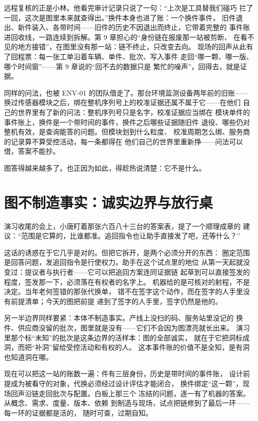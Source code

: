 远程复核的正是小林。他看完审计记录只说了一句：“上次是工具替我们碰巧
拦了一回，这次是图里本来就查得出。”换件本身也进了账：一个换件事件，
旧件退出、新件装入、各带时间——旧件的历史不因退出而终止，它带着完整的
事件账进回收线，一路连续到拆解。第 9 章担心的“身份链在报废那一站被剪断、
在看不见的地方接错”，在图里没有那一站：链不终止，只改变去向。
现场的回声从此有了回程票：每一张工单沿着车辆、单件、批次、写入事件
走回“哪一颗、哪一版、哪个时间窗”——第 9 章说的“回不去的数据只是
繁忙的噪声”，回得去，就是证据。

同样的问法，也被 ENV-01 的团队借走了。那台环境监测设备两年前的旧账——
换过传感器模块之后，绑在整机序列号上的校准证据还属不属于它——在他们
自己的世界里有了新的问法：整机序列号只是名字，校准证据应当绑在
模块单件的事件账上，换件是一个带时间的事件，换件之后哪些证据随旧件
退役、哪些仍对整机有效，是查询能答的问题。但模块划到什么粒度、
校准周期怎么绑、服务商的记录算不算受控活动，每一条都得在
他们自己的世界里重新挣——问法可以借，答案不能抄。

图答得越来越多了。也正因为如此，得趁热说清楚：它不是什么。

\section{图不制造事实：诚实边界与放行桌}

演习收尾的会上，小唐盯着那张六百八十三台的答案表，提了一个顺理成章的
建议：“范围是它算的，比谁都准。追回指令也让助手直接发了吧，还等什么？”

这话的诱惑在于它几乎是对的。但把它拆开，是两个必须分开的东西：
圈定范围是回答问题，发追回指令是行使权力。助手在这个试点里的地位
从第一天起就没变过：提议者与执行者——它可以把追回方案连同证据链
起草到可以直接签发的程度，签发那一下，必须落在有权者的名字上。
机器给的是可核对的射程，不是决定。当年老何签错的那张代换单，
错不在签字这个动作，而在签字的人手里没有前提清单；今天的图把前提
递到了签字的人手里，签字仍然是他的。

另一半边界同样要紧：本体不制造事实。产线上没扫的码、服务站里没记的
换件、供应商没留的批次，图里就是没有——它们不会因为图漂亮就长出来。
演习里那个标“未知”的批次是这条边界的活样本：图的全部诚实，
就在于它把洞标成洞，而把“补洞”留给受控活动和有权的人。
这本事件账的价值不是全知，是有洞也知道洞在哪。

现在可以把这一站的账数一遍：件有三层身份，历史是带时间的事件账，
设计前提成为被看守的对象，代换必须经过设计评估才能闭合，
换件绑定“这一颗”，现场回声沿链走回批次与配置。白板上那三个
冻结的问题，逐一有了机器的答案。从概念、需求、度量、版本、依赖
到制造与现场，试点把链修到了最后一环——每一环的证据都是活的，
随时可查，过期自知。

